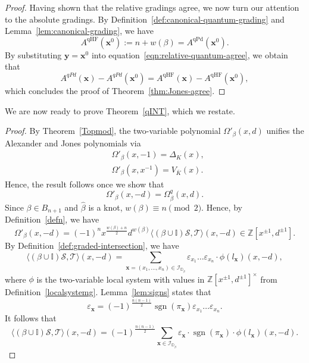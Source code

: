 \documentclass[11pt]{amsart}
\numberwithin{equation}{section}
\numberwithin{figure}{section}
\theoremstyle{definition}
\newcommand{\cI}{\mathcal{I}}
\newcommand{\cs}{\mathscr{S}}
\newcommand{\ct}{\mathscr{T}}
\newcommand{\bD}{\mathbb{D}}
\newcommand{\bI}{\mathbb{I}}
\newcommand{\bZ}{\mathbb{Z}}
\newcommand{\mK}{\overline{K}}
\DeclareMathOperator{\qHF}{qHF}
\DeclareMathOperator{\sgn}{\text{sgn}}
\DeclareMathOperator{\qPd}{qPd}
\newcommand{\xs}{\boldsymbol{x}}
\newcommand{\ys}{\boldsymbol{y}}
\begin{document}
\begin{proof}
Having shown that the relative gradings agree, we now turn our attention to the absolute gradings. By Definition~\ref{def:canonical-quantum-grading} and Lemma~\ref{lem:canonical-grading}, we have
\[
A^{\qHF}(\xs^0) := n+w(\beta) = A^{\qPd}(\xs^0).
\]
By substituting $\ys = \xs^0$ into equation~\eqref{eqn:relative-quantum-agree}, we obtain that
\[
A^{qPd}(\xs)-A^{qPd}(\xs^0) = A^{\qHF}(\xs) - A^{\qHF}(\xs^0),
\]
which concludes the proof of Theorem~\ref{thm:Jones-agree}.
\end{proof}

We are now ready to prove Theorem~\ref{qINT}, which we restate.

\thmAlexanderJones*

\begin{proof}
By Theorem~\ref{Topmod}, the two-variable polynomial $\Omega'_\beta(x,d)$ unifies the Alexander and Jones polynomials via
\begin{equation}
\begin{aligned}
&\Omega'_\beta(x,-1)=\Delta_K(x),\\
&\Omega'_\beta(x,x^{-1})=V_{\mK}(x). 
\end{aligned}
\end{equation}
Hence, the result follows once we show that
\begin{equation}\label{forms}
    \Omega'_\beta(x,-d) = \Omega^q_\beta(x,d).
\end{equation}
Since $\beta \in B_{n+1}$ and $\hat{\beta}$ is a knot, $w(\beta) \equiv n \pmod 2$. Hence, by Definition~\ref{defn}, we have
\begin{equation}\label{formulao}
\Omega'_\beta(x,-d) = (-1)^n x^{\frac{w(\beta)+n}{2}} d^{w(\beta)} \langle  (\beta \cup \mathbb I) \cs, \ct \rangle(x,-d) \in \bZ[x^{\pm 1}, d^{\pm 1}].
\end{equation}
By Definition~\ref{def:graded-intersection}, we have
\begin{equation}
\langle (\beta\cup \bI) \cs,\ct \rangle(x,-d) = \sum_{\xs = (x_1,\dots,x_n) \in \cI_{\bD_\beta}} \varepsilon_{x_1} \dots \varepsilon_{x_n} \cdot \phi(l_{\xs})(x,-d),
\end{equation}
where $\phi$ is the two-variable local system with values in $\bZ[x^{\pm 1},d^{\pm 1}]^\times$ from Definition~\ref{localsystemg}. Lemma~\ref{lem:signs} states that
\[
\varepsilon_{\xs} = (-1)^{\frac{n(n-1)}{2}} \sgn(\pi_{\xs}) \varepsilon_{x_1} \dots \varepsilon_{x_n}.
\]
It follows that
\[
\langle (\beta\cup \bI) \cs,\ct \rangle(x,-d) = (-1)^{\frac{n(n-1)}{2}} \sum_{\xs \in \cI_{\bD_\beta}} \varepsilon_{\xs} \cdot \sgn(\pi_{\xs}) \cdot \phi(l_{\xs})(x,-d).
\]
\end{proof}
\end{document}
